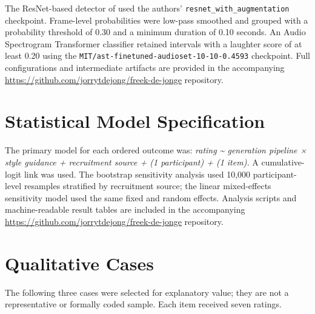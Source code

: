 \documentclass[11pt]{article}
\begin{document}
The ResNet-based detector of \citet{gillick2021robust} used the authors' \texttt{resnet\_with\_augmentation} checkpoint. Frame-level probabilities were low-pass smoothed and grouped with a probability threshold of 0.30 and a minimum duration of 0.10 seconds. An Audio Spectrogram Transformer classifier \citep{gong2021ast} retained intervals with a laughter score of at least 0.20 using the \nolinkurl{MIT/ast-finetuned-audioset-10-10-0.4593} checkpoint. Full configurations and intermediate artifacts are provided in the accompanying \url{https://github.com/jorrytdejong/freek-de-jonge} repository.

\section{Statistical Model Specification}\label{appendix-d-statistical-model-specification}

The primary model for each ordered outcome was: \emph{rating \textasciitilde{} generation pipeline × style guidance + recruitment source + (1 \textbar{} participant) + (1 \textbar{} item).} A cumulative-logit link was used. The bootstrap sensitivity analysis used 10,000 participant-level resamples stratified by recruitment source; the linear mixed-effects sensitivity model used the same fixed and random effects. Analysis scripts and machine-readable result tables are included in the accompanying \url{https://github.com/jorrytdejong/freek-de-jonge} repository.

\section{Qualitative Cases}\label{appendix-e-qualitative-cases}

The following three cases were selected for explanatory value; they are not a representative or formally coded sample. Each item received seven ratings.
\end{document}
